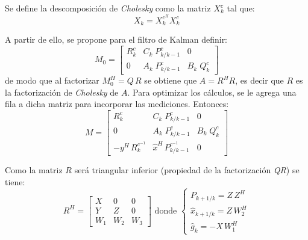 	
	Se define la descomposición de \emph{Cholesky} como la matriz $X^{c}_k$ tal que:
	\begin{equation*}
		X_k = X^{c^{H}}_k X^{c}_k
	\end{equation*}	

	A partir de ello, se propone para el filtro de Kalman definir: 
	\begin{equation*}
		M_0 = \begin{bmatrix} R^{c}_k& C_k\; P^c_{k/k-1}& 0 \\[0.3em] 0& A_k\; P^c_{k/k-1}& B_k\; Q^c_k \end{bmatrix}
	\end{equation*}
	de modo que al factorizar $M^H_0 = Q\,R$ se obtiene que $A=R^H R$, es decir que $R$ es la factorización de \emph{Cholesky} de $A$. Para optimizar los cálculos, se le agrega una fila a dicha matriz para incorporar las mediciones. Entonces:
	\begin{equation*}
	M =  \begin{bmatrix} R^{c}_k& C_k\; P^c_{k/k-1}& 0 \\[0.3em] 0& A_k\; P^c_{k/k-1}& B_k\; Q^c_k \\[0.3em] -y^H\,R^{c^{-1}}_k & \hat{x}^H\, P^{c^{-1}}_{k/k-1} & 0 \end{bmatrix}
	\end{equation*}

	Como la matriz $R$ será triangular inferior (propiedad de la factorización \emph{QR}) se tiene:
	\begin{equation*}
	R^H = \begin{bmatrix} X&0&0\\[0.3em]Y&Z&0\\[0.3em]W_1&W_2&W_3\end{bmatrix} \text{ donde } \begin{cases} P_{k+1/k} = Z\,Z^H\\ \hat{x}_{k+1/k}=Z\,W^H_2\\ \hat{g}_k = -X\,W^H_1\end{cases}
	\end{equation*}

